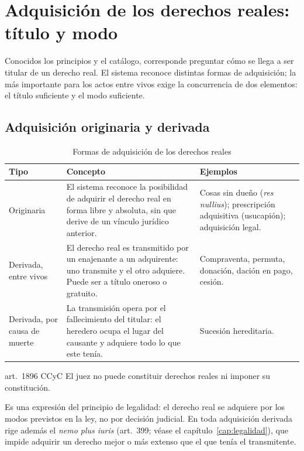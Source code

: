 \documentclass[12pt,oneside]{book}
\begin{document}
\chapter[Adquisición de los derechos reales: título y modo]{Adquisición de los derechos reales: título y modo}\label{cap:adquisicion}

Conocidos los principios y el catálogo, corresponde preguntar cómo se llega a ser titular de un derecho real. El sistema reconoce distintas formas de adquisición; la más importante para los actos entre vivos exige la concurrencia de dos elementos: el título suficiente y el modo suficiente.

\section{Adquisición originaria y derivada}

\begin{table}[H]
\centering
\small
\begin{tabularx}{\textwidth}{>{\raggedright\arraybackslash}p{}>{\raggedright\arraybackslash}X>{\raggedright\arraybackslash}p{}}
\toprule
\textbf{Tipo} & \textbf{Concepto} & \textbf{Ejemplos} \\
\midrule
Originaria & El sistema reconoce la posibilidad de adquirir el derecho real en forma libre y absoluta, sin que derive de un vínculo jurídico anterior. & Cosas sin dueño (\textit{res nullius}); prescripción adquisitiva (usucapión); adquisición legal. \\
Derivada, entre vivos & El derecho real es transmitido por un enajenante a un adquirente: uno transmite y el otro adquiere. Puede ser a título oneroso o gratuito. & Compraventa, permuta, donación, dación en pago, cesión. \\
Derivada, por causa de muerte & La transmisión opera por el fallecimiento del titular: el heredero ocupa el lugar del causante y adquiere todo lo que este tenía. & Sucesión hereditaria. \\
\bottomrule
\end{tabularx}
\caption{Formas de adquisición de los derechos reales}
\end{table}

\begin{regla}{art.~1896 CCyC}
El juez no puede constituir derechos reales ni imponer su constitución.
\end{regla}

Es una expresión del principio de legalidad: el derecho real se adquiere por los modos previstos en la ley, no por decisión judicial. En toda adquisición derivada rige además el \textit{nemo plus iuris} (art.~399; véase el capítulo~\ref{cap:legalidad}), que impide adquirir un derecho mejor o más extenso que el que tenía el transmitente.
\end{document}
